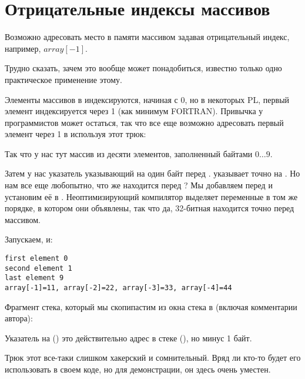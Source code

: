 \chapter{Отрицательные индексы массивов}
\label{negative_array_indices}

Возможно
адресовать место в памяти  массивом задавая отрицательный индекс, например, $array[-1]$.

Трудно сказать, зачем это вообще может понадобиться, известно только одно практическое
применение этому.

Элементы массивов в \CCpp индексируются, начиная с 0, но в некоторых \ac{PL}, первый элемент 
индексируется через 1 (как минимум FORTRAN).
Привычка у программистов может остаться, так что все еще возможно адресовать
первый элемент через 1 в \CCpp используя этот трюк:





Так что у нас тут массив  из десяти элементов, заполненный байтами $0 \ldots 9$.

Затем у нас указатель  указывающий на один байт перед .
 указывает точно на .
Но нам все еще любопытно, что же находится перед ?
Мы добавляем  перед  и установим её в .
Неоптимизирующий компилятор выделяет переменные в том же порядке, в котором они 
объявлены, так что да, 32-битная  находится точно перед массивом.

Запускаем, и:

\begin{lstlisting}
first element 0
second element 1
last element 9
array[-1]=11, array[-2]=22, array[-3]=33, array[-4]=44
\end{lstlisting}

Фрагмент стека, который мы скопипастим из окна стека в \olly (включая комментарии автора):



Указатель на  () это действительно адрес  в стеке (), 
но минус 1 байт.

Трюк этот все-таки слишком хакерский и сомнительный. Вряд ли кто-то будет его использовать в своем коде,
но для демонстрации, он здесь очень уместен.

